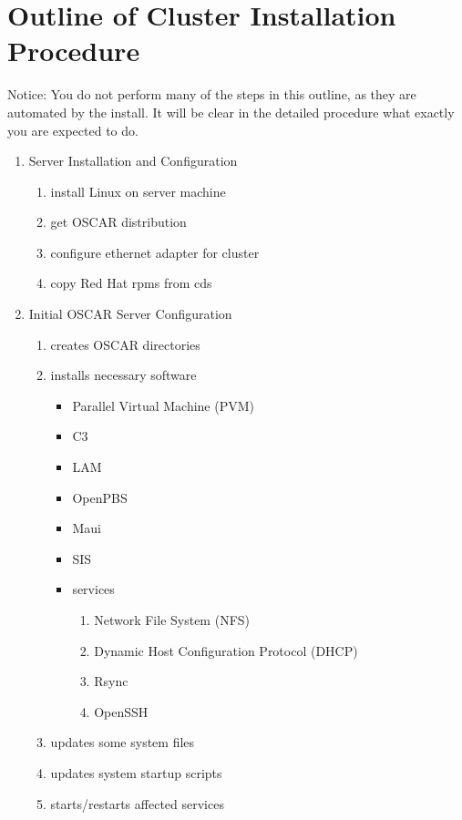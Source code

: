 %
%
%

\section{Outline of Cluster Installation Procedure}

Notice: You do not perform many of the steps in this outline, as they
are automated by the install. It will be clear in the detailed
procedure what exactly you are expected to do.

\begin{enumerate}
        \item Server Installation and Configuration
        \begin{enumerate}
                \item install Linux on server machine
                \item get OSCAR distribution
                \item configure ethernet adapter for cluster
                \item copy Red Hat rpms from cds
        \end{enumerate}

        \item Initial OSCAR Server Configuration
        \begin{enumerate}
                \item creates OSCAR directories
                \item installs necessary software
                \begin{itemize}
                        \item Parallel Virtual Machine (PVM)
                        \item C3
                        \item LAM
                        \item OpenPBS
                        \item Maui
                        \item SIS
                        \item services
                        \begin{enumerate}
                                \item Network File System (NFS)
                                \item Dynamic Host Configuration Protocol (DHCP)
                                \item Rsync
                                \item OpenSSH
                        \end{enumerate}
                \end{itemize}
                \item updates some system files
                \item updates system startup scripts
                \item starts/restarts affected services
        \end{enumerate}


\end{enumerate}
